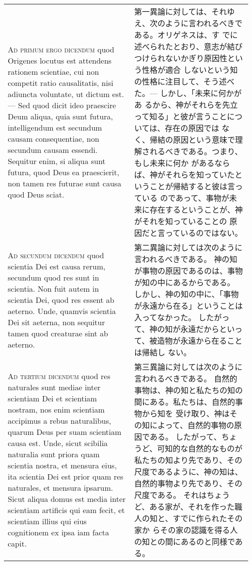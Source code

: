 \documentclass[10pt]{jsarticle} %
\begin{document}
\begin{longtable}{p{21em}p{21em}}
\\


{\scshape Ad primum ergo dicendum} quod Origenes locutus
est attendens rationem scientiae, cui non competit ratio causalitatis,
nisi adiuncta voluntate, ut dictum est. --- Sed quod dicit ideo praescire
Deum aliqua, quia sunt futura, intelligendum est secundum causam
consequentiae, non secundum causam essendi. Sequitur enim, si aliqua
sunt futura, quod Deus ea praescierit, non tamen res futurae sunt causa
quod Deus sciat.


&

第一異論に対しては、それゆえ、次のように言われるべきである。オリゲネスは、す
でに述べられたとおり、意志が結びつけられないかぎり原因性という性格が適合
しないという知の性格に注目して、そう述べた。--- しかし、「未来に何かがあ
るから、神がそれらを先立って知る」と彼が言うことについては、存在の原因では
なく、帰結の原因という意味で理解されるべきである。つまり、もし未来に何か
があるならば、神がそれらを知っていたということが帰結すると彼は言っている
のであって、事物が未来に存在するということが、神がそれを知っていることの
原因だと言っているのではない。

\\


{\scshape Ad secundum dicendum} quod scientia Dei est causa rerum,
secundum quod res sunt in scientia. Non fuit autem in scientia Dei, quod
res essent ab aeterno. Unde, quamvis scientia Dei sit aeterna, non
sequitur tamen quod creaturae sint ab aeterno.

&


第二異論に対しては次のように言われるべきである。
神の知が事物の原因であるのは、事物が知の中にあるからである。
しかし、神の知の中に、「事物が永遠から在る」ということは入ってなかった。
したがって、神の知が永遠だからといって、被造物が永遠から在ることは帰結し
 ない。

\\


{\scshape Ad tertium dicendum} quod res naturales sunt
mediae inter scientiam Dei et scientiam nostram, nos enim scientiam
accipimus a rebus naturalibus, quarum Deus per suam scientiam causa
est. Unde, sicut scibilia naturalia sunt priora quam scientia nostra, et
mensura eius, ita scientia Dei est prior quam res naturales, et mensura
ipsarum. Sicut aliqua domus est media inter scientiam artificis qui eam
fecit, et scientiam illius qui eius cognitionem ex ipsa iam facta capit.


&

第三異論に対しては次のように言われるべきである。
自然的事物は、神の知と私たちの知の間にある。私たちは、自然的事物から知を
 受け取り、神はその知によって、自然的事物の原因である。
したがって、ちょうど、可知的な自然的なものが私たちの知より先であり、その
 尺度であるように、神の知は、自然的事物より先であり、その尺度である。
それはちょうど、ある家が、それを作った職人の知と、すでに作られたその家か
 らその家の認識を得る人の知との間にあるのと同様である。


\end{longtable}
\end{document}
